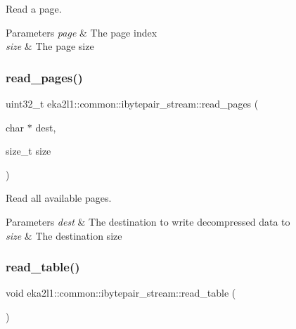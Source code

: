 Read a page. 


\begin{DoxyParams}{Parameters}
{\em page} & The page index \\
\hline
{\em size} & The page size \\
\hline
\end{DoxyParams}
\mbox{\label{classeka2l1_1_1common_1_1ibytepair__stream_adab55d51034ac5e7b2c2ca4c363725de}} 
\subsubsection{\texorpdfstring{read\+\_\+pages()}{read\_pages()}}
{\footnotesize\ttfamily uint32\+\_\+t eka2l1\+::common\+::ibytepair\+\_\+stream\+::read\+\_\+pages (\begin{DoxyParamCaption}\item[{char $\ast$}]{dest,  }\item[{size\+\_\+t}]{size }\end{DoxyParamCaption})}



Read all available pages. 


\begin{DoxyParams}{Parameters}
{\em dest} & The destination to write decompressed data to \\
\hline
{\em size} & The destination size \\
\hline
\end{DoxyParams}
\mbox{\label{classeka2l1_1_1common_1_1ibytepair__stream_a721832bf82c79afb26b572adc05c571b}} 
\subsubsection{\texorpdfstring{read\+\_\+table()}{read\_table()}}
{\footnotesize\ttfamily void eka2l1\+::common\+::ibytepair\+\_\+stream\+::read\+\_\+table (\begin{DoxyParamCaption}{ }\end{DoxyParamCaption})}



